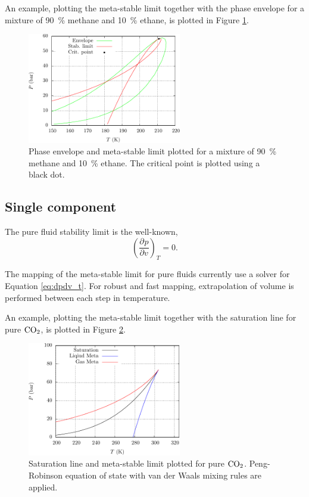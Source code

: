\documentclass[english]{../thermomemo/thermomemo}
\newcommand*{\pd}[3][]{\frac{\partial^{#1}#2}{\partial{#3}^{#1}}}%
\newcommand{\coto}{\ensuremath{\text{CO}_{\text{\scriptsize 2}}}}
\begin{document}
An example, plotting the meta-stable limit together with the phase
envelope for a mixture of \SI{90}{\percent} methane and
\SI{10}{\percent} ethane, is plotted in Figure \ref{fig:meta}.
\begin{figure}[h]
  \centering
  \includegraphics[width=0.6\textwidth]{meta}
  \caption{Phase envelope and meta-stable limit plotted for a mixture
    of \SI{90}{\percent} methane and \SI{10}{\percent} ethane. The
    critical point is plotted using a black dot.}
  \label{fig:meta}
\end{figure}


\subsection{Single component}
The pure fluid stability limit is the well-known,
\begin{equation}
  \label{eq:dpdv_t}
  \left(\pd{p}{v}\right)_T = 0.
\end{equation}

The mapping of the meta-stable limit for pure fluids currently use a
solver for Equation \ref{eq:dpdv_t}. For robust and fast mapping,
extrapolation of volume is performed between each step in temperature.


An example, plotting the meta-stable limit together with the
saturation line for pure \coto, is plotted in Figure
\ref{fig:singleMeta}.
\begin{figure}[h]
  \centering
  \includegraphics[width=0.6\textwidth]{singleMeta}
  \caption{Saturation line and meta-stable limit plotted for pure
    \coto. Peng-Robinson equation of state with van der Waals mixing
    rules are applied.}
  \label{fig:singleMeta}
\end{figure}
\end{document}

